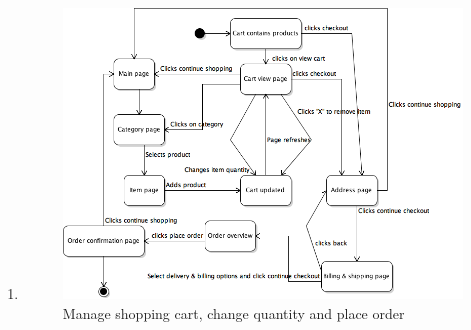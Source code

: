 \documentclass[UKenglish,12pt]{article}
\begin{document}
\begin{enumerate}
\item %
\begin{figure}[H]
\centering
\includegraphics[scale=0.60,keepaspectratio]{Images/BuyProductsandChangeCart.png}
\caption{Manage shopping cart, change quantity and place order}
\end{figure}


\end{enumerate}
\end{document}
